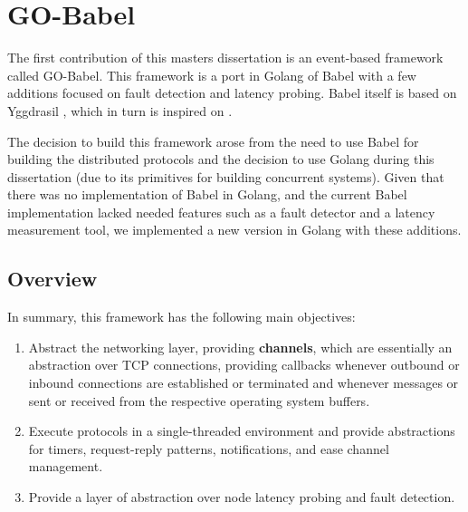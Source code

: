 

\chapter{GO-Babel}
\label{cha:GO-Babel}

The first contribution of this masters dissertation is an event-based framework called GO-Babel. This framework is a port in Golang  of Babel  with a few additions focused on fault detection and latency probing. Babel  itself is based on Yggdrasil , which in turn is inspired on .

The decision to build this framework arose from the need to use Babel for building the distributed protocols and the decision to use Golang during this dissertation (due to its primitives for building concurrent systems). Given that there was no implementation of Babel in Golang, and the current Babel implementation lacked needed features such as a fault detector and a latency measurement tool, we implemented a new version in Golang with these additions.

\section{Overview}

In summary, this framework has the following main objectives:

\begin{enumerate}

    \item Abstract the networking layer, providing \textbf{channels}, which are essentially an abstraction over TCP connections, providing callbacks whenever outbound or inbound connections are established or terminated and whenever messages or sent or received from the respective operating system buffers.

    \item Execute protocols in a single-threaded environment and provide abstractions for timers, request-reply patterns, notifications, and ease channel management.

    \item Provide a layer of abstraction over node latency probing and fault detection.

\end{enumerate}

